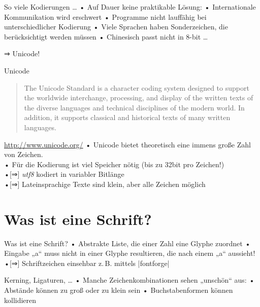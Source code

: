 \begin{frame}{So viele Kodierungen …}
• Auf Dauer keine praktikable Lösung:
• Internationale Kommunikation wird erschwert
• Programme nicht lauffähig bei unterschiedlicher Kodierung
• Viele Sprachen haben Sonderzeichen, die berücksichtigt werden müssen
• Chinesisch passt nicht in 8-bit …
\•
\pause
\centerline{\Large ⇒ Unicode!}
\end{frame}

\begin{frame}{Unicode}
\begin{quotation}
The Unicode Standard is a character coding system designed to support the worldwide interchange, processing, and display of the written texts of the diverse languages and technical disciplines of the modern world. In addition, it supports classical and historical texts of many written languages.\\
\end{quotation}
\url{http://www.unicode.org/}
\pause 
• Unicode bietet theoretisch eine immens große Zahl von Zeichen.\\
• Für die Kodierung ist viel Speicher nötig (bis zu 32bit pro Zeichen!)\\
•[⇒] \emph{utf8} kodiert in variabler Bitlänge\\
•[⇒] Lateinsprachige Texte sind klein, aber alle Zeichen möglich
\•
\end{frame}


\section{Was ist eine Schrift?}
\begin{frame}[fragile]{Was ist eine Schrift?}
• Abstrakte Liste, die einer Zahl eine Glyphe zuordnet
• Eingabe „a“ muss nicht in einer Glyphe resultieren, die nach einem „a“ aussieht!
•[⇒] Schriftzeichen einsehbar z.\,B. mittels |fontforge|
\• 
\end{frame}

\begin{frame}{Kerning, Ligaturen, …}
• Manche Zeichenkombinationen sehen „unschön“ aus:
• Abstände können zu groß oder zu klein sein
• Buchstabenformen können kollidieren
\•
\end{frame}

